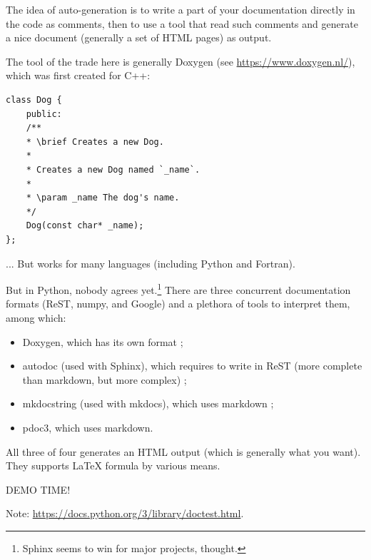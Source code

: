 \documentclass[10pt,
aspectratio=169
]{beamer}
\begin{document}
\begin{frame}[fragile]
	The idea of auto-generation is to write a part of your documentation directly in the code as comments, then to use a tool that read such comments  and generate a nice document (generally a set of HTML pages) as output. 
	
	The tool of the trade here is generally Doxygen (see \url{https://www.doxygen.nl/}), which was first created for C++:
	\begin{verbatim}
class Dog {
	public:
	/**
	* \brief Creates a new Dog.
	*
	* Creates a new Dog named `_name`.
	*
	* \param _name The dog's name.
	*/
	Dog(const char* _name);
};
	\end{verbatim}
	... But works for many languages (including Python and Fortran).
\end{frame}

\begin{frame}
	But in Python, nobody  agrees yet.\footnote{Sphinx seems to win for major projects, thought.} There are three concurrent documentation formats (ReST, numpy, and Google) and a plethora of tools to interpret them, among which:\begin{itemize}
		\item Doxygen, which has its own format ;
		\item autodoc (used with Sphinx), which requires to write in ReST (more complete than markdown, but more complex) ;
		\item mkdocstring (used with mkdocs), which uses markdown ;
		\item pdoc3, which uses markdown.
	\end{itemize}
	All three of four generates an HTML output (which is generally what you want). They supports LaTeX formula by various means.
\end{frame}

\begin{frame}
	\begin{center}
		{\LARGE DEMO TIME!}
	\end{center}
	
	Note: \url{https://docs.python.org/3/library/doctest.html}.
\end{frame}
\end{document}
